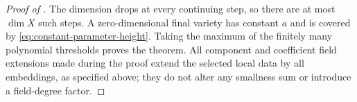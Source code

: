 \begin{proof}[Proof of ]
The dimension drops at every continuing step, so there are at most
$\dim X$ such steps.  A zero-dimensional final variety has constant
$a$ and is covered by \eqref{eq:constant-parameter-height}.  Taking the
maximum of the finitely many polynomial thresholds proves the theorem.
All component and coefficient field extensions made during the proof
extend the selected local data by all embeddings, as specified above;
they do not alter any smallness sum or introduce a field-degree factor.
\end{proof}
